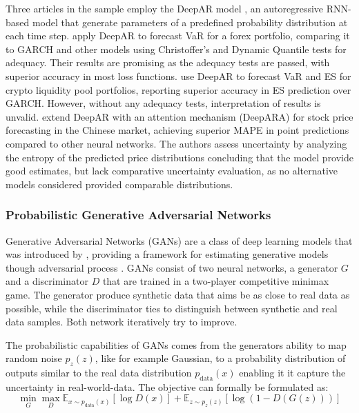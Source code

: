 Three articles in the sample employ the DeepAR model \parencite{Salinas2019DeepAR}, an autoregressive RNN-based model that generate parameters of a predefined probability distribution at each time step. \textcite{Fatouros2023DeepVaR} apply DeepAR to forecast VaR for a forex portfolio, comparing it to GARCH and other models using Christoffer's and Dynamic Quantile tests for adequacy. Their results are promising as the adequacy tests are passed, with superior accuracy in most loss functions. \textcite{Almeida2024RiskForecasting} use DeepAR to forecast VaR and ES for crypto liquidity pool portfolios, reporting superior accuracy in ES prediction over GARCH. However, without any adequacy tests, interpretation of results is unvalid. \textcite{Li2024DeepAR} extend DeepAR with an attention mechanism (DeepARA) for stock price forecasting in the Chinese market, achieving superior MAPE in point predictions compared to other neural networks. The authors assess uncertainty by analyzing the entropy of the predicted price distributions concluding that the model provide good estimates, but lack comparative uncertainty evaluation, as no alternative models considered provided comparable distributions.  



\subsubsection{Probabilistic Generative Adversarial Networks}
Generative Adversarial Networks (GANs) are a class of deep learning models that was introduced by \textcite{goodfellow2014gan}, providing a framework for estimating generative models though adversarial process \parencite{goodfellow2014gan}. GANs consist of two neural networks, a generator $G$ and a discriminator $D$ that are trained in a two-player competitive minimax game.
The generator produce synthetic data that aims be as close to real data as possible, while the discriminator ties to distinguish between synthetic and real data samples. Both network iteratively try to improve. 

The probabilistic capabilities of GANs comes from the generators ability to map random noise $p_z(z)$, like for example Gaussian, to a probability distribution of outputs similar to the real data distribution $p_{\text{data}}(x)$ enabling it it capture the uncertainty in real-world-data. The objective can formally be formulated as: 
\begin{equation}
\min_{G} \max_{D}  \mathbb{E}_{x \sim p_{\text{data}}(x)}[\log D(x)] + \mathbb{E}_{z \sim p_z(z)}[\log (1 - D(G(z)))]
\end{equation} 

